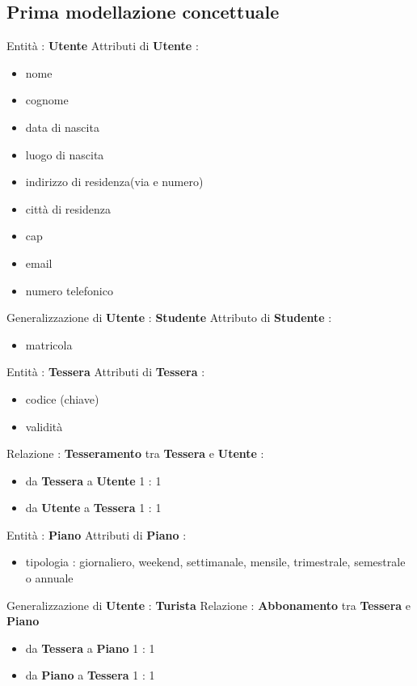 \documentclass[a4paper,twoside]{article}
\begin{document}
\subsection{Prima modellazione concettuale}
Entità : \textbf{Utente}\newline
Attributi di \textbf{Utente} :
\begin{itemize}
 \item nome
 \item cognome
 \item data di nascita
 \item luogo di nascita
 \item indirizzo di residenza(via e numero)
 \item città di residenza
 \item cap
 \item email
 \item numero telefonico
\end{itemize}
Generalizzazione di \textbf{Utente} : \textbf{Studente}\newline
Attributo di \textbf{Studente} :
\begin{itemize}
 \item matricola
\end{itemize}
Entità : \textbf{Tessera}\newline
Attributi di \textbf{Tessera} :
\begin{itemize}
 \item codice (chiave)
 \item validità
\end{itemize}
Relazione : \textbf{Tesseramento} tra \textbf{Tessera} e \textbf{Utente} :
\begin{itemize}
 \item da \textbf{Tessera} a \textbf{Utente} 1 : 1
 \item da \textbf{Utente} a \textbf{Tessera} 1 : 1
\end{itemize}
Entità : \textbf{Piano}\newline
Attributi di \textbf{Piano} :
\begin{itemize}
 \item tipologia : giornaliero, weekend, settimanale, mensile, trimestrale, semestrale o annuale
\end{itemize}
Generalizzazione di \textbf{Utente} : \textbf{Turista}\newline
Relazione : \textbf{Abbonamento} tra \textbf{Tessera} e \textbf{Piano}
\begin{itemize}
 \item da \textbf{Tessera} a \textbf{Piano} 1 : 1
 \item da \textbf{Piano} a \textbf{Tessera} 1 : 1
\end{itemize}
\end{document}
